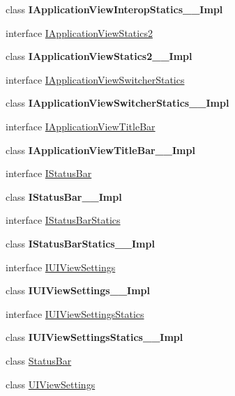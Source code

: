 \begin{DoxyCompactItemize}
\item 
class {\bfseries I\+Application\+View\+Interop\+Statics\+\_\+\+\_\+\+Impl}
\item 
interface \hyperlink{interface_windows_1_1_u_i_1_1_view_management_1_1_i_application_view_statics2}{I\+Application\+View\+Statics2}
\item 
class {\bfseries I\+Application\+View\+Statics2\+\_\+\+\_\+\+Impl}
\item 
interface \hyperlink{interface_windows_1_1_u_i_1_1_view_management_1_1_i_application_view_switcher_statics}{I\+Application\+View\+Switcher\+Statics}
\item 
class {\bfseries I\+Application\+View\+Switcher\+Statics\+\_\+\+\_\+\+Impl}
\item 
interface \hyperlink{interface_windows_1_1_u_i_1_1_view_management_1_1_i_application_view_title_bar}{I\+Application\+View\+Title\+Bar}
\item 
class {\bfseries I\+Application\+View\+Title\+Bar\+\_\+\+\_\+\+Impl}
\item 
interface \hyperlink{interface_windows_1_1_u_i_1_1_view_management_1_1_i_status_bar}{I\+Status\+Bar}
\item 
class {\bfseries I\+Status\+Bar\+\_\+\+\_\+\+Impl}
\item 
interface \hyperlink{interface_windows_1_1_u_i_1_1_view_management_1_1_i_status_bar_statics}{I\+Status\+Bar\+Statics}
\item 
class {\bfseries I\+Status\+Bar\+Statics\+\_\+\+\_\+\+Impl}
\item 
interface \hyperlink{interface_windows_1_1_u_i_1_1_view_management_1_1_i_u_i_view_settings}{I\+U\+I\+View\+Settings}
\item 
class {\bfseries I\+U\+I\+View\+Settings\+\_\+\+\_\+\+Impl}
\item 
interface \hyperlink{interface_windows_1_1_u_i_1_1_view_management_1_1_i_u_i_view_settings_statics}{I\+U\+I\+View\+Settings\+Statics}
\item 
class {\bfseries I\+U\+I\+View\+Settings\+Statics\+\_\+\+\_\+\+Impl}
\item 
class \hyperlink{class_windows_1_1_u_i_1_1_view_management_1_1_status_bar}{Status\+Bar}
\item 
class \hyperlink{class_windows_1_1_u_i_1_1_view_management_1_1_u_i_view_settings}{U\+I\+View\+Settings}
\end{DoxyCompactItemize}

